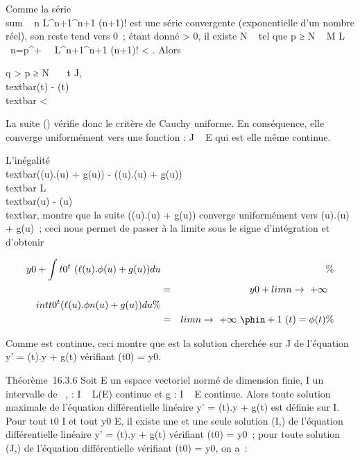 Comme la série \\sum ~
n L^n+1\eta^n+1 \over
(n+1)! est une série convergente (exponentielle d'un nombre réel), son
reste tend vers 0~; étant donné \epsilon \textgreater{} 0, il existe N \in {}~ tel
que p ≥ N \rigtharrow~ M \over L \
\sum  n=p^+\infty~~
L^n+1\eta^n+1 \over (n+1)!
\textless{} \epsilon. Alors

q \textgreater{} p ≥ N \rigtharrow~\forall~~t \in J,
\\textbar{}\phiq(t) -
\phip(t)\\textbar{} \textless{} \epsilon

La suite (\phin) vérifie donc le critère de Cauchy uniforme. En
conséquence, elle converge uniformément vers une fonction \phi : J \rightarrow~ E qui
est elle même continue.

L'inégalité \\textbar{}(\ell(u).\phi(u) + g(u)) -
(\ell(u).\phin(u) + g(u))\\textbar{} \leq
L\\textbar{}\phi(u) -
\phin(u)\\textbar{}, montre que la suite
\left (\ell(u).\phin(u) + g(u)\right )
converge uniformément vers \ell(u).\phi(u) + g(u)~; ceci nous permet de passer
à la limite sous le signe d'intégration et d'obtenir

\begin{align*} y0
+\int  t0^t~(\ell(u).\phi(u)
+ g(u)) du&& \%& \\ & =& y0
+ limn\rightarrow~+\infty~~\\int
 t0^t(\ell(u).\phi n(u) + g(u)) du\%&
\\ & =&
limn\rightarrow~+\infty~\phin+1~(t) = \phi(t) \%&
\\ \end{align*}

Comme \phi est continue, ceci montre que \phi est la solution cherchée sur J
de l'équation y' = \ell(t).y + g(t) vérifiant \phi(t0) =
y0.

Théorème~16.3.6 Soit E un espace vectoriel normé de dimension finie, I
un intervalle de \mathbb{R}~, \ell : I \rightarrow~ L(E) continue et g : I \rightarrow~ E continue. Alors
toute solution maximale de l'équation différentielle linéaire y' =
\ell(t).y + g(t) est définie sur I. Pour tout t0 \in I et tout
y0 \in E, il existe une et une seule solution (I,\phi) de
l'équation différentielle linéaire y' = \ell(t).y + g(t) vérifiant
\phi(t0) = y0~; pour toute solution (J,\psi) de l'équation
différentielle vérifiant \psi(t0) = y0, on a~:

